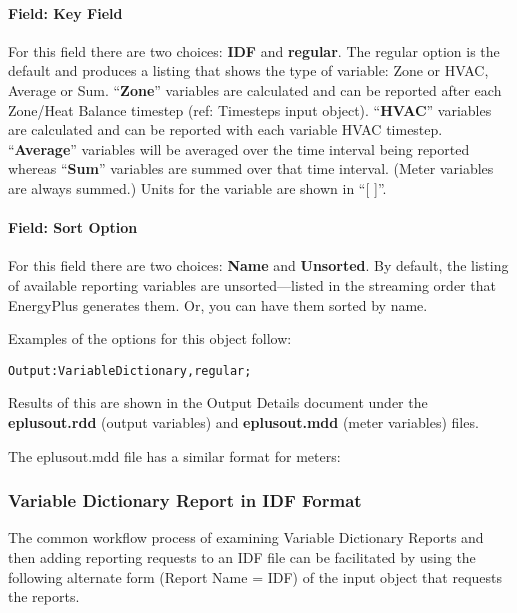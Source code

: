 \paragraph{Field: Key Field}\label{field-key-field}

For this field there are two choices: \textbf{IDF} and \textbf{regular}. The regular option is the default and produces a listing that shows the type of variable: Zone or HVAC, Average or Sum. ``\textbf{Zone}'' variables are calculated and can be reported after each Zone/Heat Balance timestep (ref: Timesteps input object). ``\textbf{HVAC}'' variables are calculated and can be reported with each variable HVAC timestep. ``\textbf{Average}'' variables will be averaged over the time interval being reported whereas ``\textbf{Sum}'' variables are summed over that time interval. (Meter variables are always summed.) Units for the variable are shown in ``{[} {]}''.

\paragraph{Field: Sort Option}\label{field-sort-option}

For this field there are two choices: \textbf{Name} and \textbf{Unsorted}. By default, the listing of available reporting variables are unsorted---listed in the streaming order that EnergyPlus generates them. Or, you can have them sorted by name.

Examples of the options for this object follow:

\begin{lstlisting}
Output:VariableDictionary,regular;
\end{lstlisting}

Results of this are shown in the Output Details document under the \textbf{eplusout.rdd} (output variables) and \textbf{eplusout.mdd} (meter variables) files.

The eplusout.mdd file has a similar format for meters:

\subsubsection{Variable Dictionary Report in IDF Format}\label{variable-dictionary-report-in-idf-format}

The common workflow process of examining Variable Dictionary Reports and then adding reporting requests to an IDF file can be facilitated by using the following alternate form (Report Name = IDF) of the input object that requests the reports.

